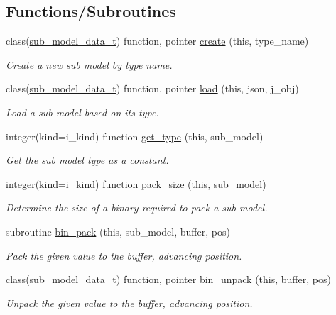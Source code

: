 \subsection*{Functions/\+Subroutines}
\begin{DoxyCompactItemize}
\item 
class(\mbox{\hyperlink{structpmc__sub__model__data_1_1sub__model__data__t}{sub\+\_\+model\+\_\+data\+\_\+t}}) function, pointer \mbox{\hyperlink{namespacepmc__sub__model__factory_a599e3183a43b40a0483f597d3a8f3f9f}{create}} (this, type\+\_\+name)
\begin{DoxyCompactList}\small\item\em Create a new sub model by type name. \end{DoxyCompactList}\item 
class(\mbox{\hyperlink{structpmc__sub__model__data_1_1sub__model__data__t}{sub\+\_\+model\+\_\+data\+\_\+t}}) function, pointer \mbox{\hyperlink{namespacepmc__sub__model__factory_a21d3927bba83911130615002ee7a4843}{load}} (this, json, j\+\_\+obj)
\begin{DoxyCompactList}\small\item\em Load a sub model based on its type. \end{DoxyCompactList}\item 
integer(kind=i\+\_\+kind) function \mbox{\hyperlink{namespacepmc__sub__model__factory_ad0a9ba95d8500fc520d015d1f54342f1}{get\+\_\+type}} (this, sub\+\_\+model)
\begin{DoxyCompactList}\small\item\em Get the sub model type as a constant. \end{DoxyCompactList}\item 
integer(kind=i\+\_\+kind) function \mbox{\hyperlink{namespacepmc__sub__model__factory_a3678cad0d68a882ea264dc847eb1bd45}{pack\+\_\+size}} (this, sub\+\_\+model)
\begin{DoxyCompactList}\small\item\em Determine the size of a binary required to pack a sub model. \end{DoxyCompactList}\item 
subroutine \mbox{\hyperlink{namespacepmc__sub__model__factory_ac14660d8917b4bf63e286d53535edc9d}{bin\+\_\+pack}} (this, sub\+\_\+model, buffer, pos)
\begin{DoxyCompactList}\small\item\em Pack the given value to the buffer, advancing position. \end{DoxyCompactList}\item 
class(\mbox{\hyperlink{structpmc__sub__model__data_1_1sub__model__data__t}{sub\+\_\+model\+\_\+data\+\_\+t}}) function, pointer \mbox{\hyperlink{namespacepmc__sub__model__factory_a0c4ac33aa5d78a5ad23805bacb8d7869}{bin\+\_\+unpack}} (this, buffer, pos)
\begin{DoxyCompactList}\small\item\em Unpack the given value to the buffer, advancing position. \end{DoxyCompactList}\end{DoxyCompactItemize}
